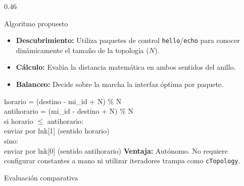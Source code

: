 \documentclass[final]{beamer}
\begin{document}
\begin{frame}[t]
\begin{columns}[T,totalwidth=0.98\paperwidth]
\begin{column}{0.46\paperwidth}
  \begin{block}{Algoritmo propuesto}
    \begin{itemize}
      \item \textbf{Descubrimiento:} Utiliza paquetes de control \texttt{hello}/\texttt{echo} para conocer dinámicamente el tamaño de la topología ($N$).
      \item \textbf{Cálculo:} Evalúa la distancia matemática en ambos sentidos del anillo.
      \item \textbf{Balanceo:} Decide sobre la marcha la interfaz óptima por paquete.
    \end{itemize}
    \vspace{0.3cm}
    {\Large\ttfamily
    horario = (destino - mi\_id + N) \% N\\[0.12cm]
    antihorario = (mi\_id - destino + N) \% N\\[0.12cm]
    si horario $\le$ antihorario:\\[0.12cm]
    \quad enviar por lnk[1] (sentido horario)\\[0.12cm]
    sino:\\[0.12cm]
    \quad enviar por lnk[0] (sentido antihorario)
    }
    \vspace{0.3cm}
    \textbf{Ventaja:} Autónomo. No requiere configurar constantes a mano ni utilizar iteradores trampa como \texttt{cTopology}.
  \end{block}

  \vspace{0.45cm}

  \begin{block}{Evaluación comparativa}

    \vspace{0.4cm}
    \centering


\end{block}
\end{column}
\end{columns}
\end{frame}
\end{document}
